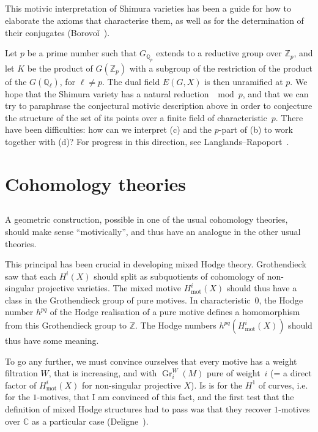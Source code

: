 \documentclass{article}
\theoremstyle{plain}
\theoremstyle{definition}
\newcommand{\ZZ}{\mathbb{Z}}
\newcommand{\QQ}{\mathbb{Q}}
\newcommand{\CC}{\mathbb{C}}
\newcommand{\mot}{\mathrm{mot}}
\DeclareMathOperator{\Gr}{Gr}
\begin{document}
\subsection{}
\label{1.8}

This motivic interpretation of Shimura varieties has been a guide for how to elaborate the axioms that characterise them, as well as for the determination of their conjugates (Borovo\v{i}~\cite{6}).

Let $p$ be a prime number such that $G_{\QQ_p}$ extends to a reductive group over $\ZZ_p$, and let $K$ be the product of $G(\ZZ_p)$ with a subgroup of the restriction of the product of the $G(\QQ_\ell)$, for $\ell\neq p$.
The dual field $E(G,X)$ is then unramified at $p$.
We hope that the Shimura variety has a natural reduction $\mod p$, and that we can try to paraphrase the conjectural motivic description above in order to conjecture the structure of the set of its points over a finite field of characteristic~$p$.
There have been difficulties: how can we interpret (c) and the $p$-part of (b) to work together with (d)?
For progress in this direction, see Langlands--Rapoport~\cite{23}.


\section{Cohomology theories}
\label{2}

\subsection{}
\label{2.1}

A geometric construction, possible in one of the usual cohomology theories, should make sense ``motivically'', and thus have an analogue in the other usual theories.

This principal has been crucial in developing mixed Hodge theory.
Grothendieck saw that each $H^i(X)$ should split as subquotients of cohomology of non-singular projective varieties.
The mixed motive $H_\mot^i(X)$ should thus have a class in the Grothendieck group of pure motives.
In characteristic~$0$, the Hodge number $h^{pq}$ of the Hodge realisation of a pure motive defines a homomorphism from this Grothendieck group to $\ZZ$.
The Hodge numbers $h^{pq}(H_\mot^i(X))$ should thus have some meaning.

To go any further, we must convince ourselves that every motive has a weight filtration $W$, that is increasing, and with $\Gr_i^W(M)$ pure of weight~$i$ (= a direct factor of $H_\mot^i(X)$ for non-singular projective $X$).
Is is for the $H^1$ of curves, i.e. for the $1$-motives, that I am convinced of this fact, and the first test that the definition of mixed Hodge structures had to pass was that they recover $1$-motives over $\CC$ as a particular case (Deligne~\cite[§10]{9}).
\end{document}

